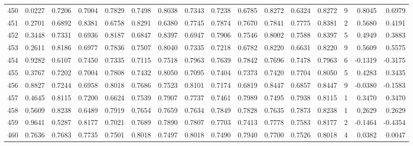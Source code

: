 \begin{tabular}{lrrrrrrrrrrrrrrr}
450 &      0.0227 &  0.7206 &  0.7004 &  0.7829 &  0.7498 &  0.8038 &  0.7343 &  0.7238 &  0.6785 &  0.8272 &   0.6324 &     0.8272 &      9 &                    0.8045 &                     0.6979 \\
451 &      0.2701 &  0.6892 &  0.8381 &  0.6758 &  0.8291 &  0.6380 &  0.7745 &  0.7874 &  0.7670 &  0.7841 &   0.7775 &     0.8381 &      2 &                    0.5680 &                     0.4191 \\
452 &      0.3448 &  0.7331 &  0.6936 &  0.8187 &  0.6847 &  0.8397 &  0.6947 &  0.7906 &  0.7546 &  0.8002 &   0.7588 &     0.8397 &      5 &                    0.4949 &                     0.3883 \\
453 &      0.2611 &  0.8186 &  0.6977 &  0.7836 &  0.7507 &  0.8040 &  0.7335 &  0.7218 &  0.6782 &  0.8220 &   0.6631 &     0.8220 &      9 &                    0.5609 &                     0.5575 \\
454 &      0.9282 &  0.6107 &  0.7450 &  0.7335 &  0.7115 &  0.7518 &  0.7963 &  0.7639 &  0.7842 &  0.7696 &   0.7478 &     0.7963 &      6 &                   -0.1319 &                    -0.3175 \\
455 &      0.3767 &  0.7202 &  0.7004 &  0.7808 &  0.7432 &  0.8050 &  0.7095 &  0.7404 &  0.7373 &  0.7420 &   0.7704 &     0.8050 &      5 &                    0.4283 &                     0.3435 \\
456 &      0.8827 &  0.7244 &  0.6958 &  0.8018 &  0.7686 &  0.7523 &  0.8101 &  0.7174 &  0.6819 &  0.8447 &   0.6857 &     0.8447 &      9 &                   -0.0380 &                    -0.1583 \\
457 &      0.4645 &  0.8115 &  0.7200 &  0.6624 &  0.7539 &  0.7907 &  0.7737 &  0.7461 &  0.7989 &  0.7495 &   0.7938 &     0.8115 &      1 &                    0.3470 &                     0.3470 \\
458 &      0.5609 &  0.8238 &  0.6489 &  0.7919 &  0.7654 &  0.7659 &  0.7634 &  0.7849 &  0.7828 &  0.7635 &   0.7873 &     0.8238 &      1 &                    0.2629 &                     0.2629 \\
459 &      0.9641 &  0.5287 &  0.8177 &  0.7021 &  0.7689 &  0.7890 &  0.7807 &  0.7703 &  0.7413 &  0.7778 &   0.7583 &     0.8177 &      2 &                   -0.1464 &                    -0.4354 \\
460 &      0.7636 &  0.7683 &  0.7735 &  0.7501 &  0.8018 &  0.7497 &  0.8018 &  0.7490 &  0.7940 &  0.7700 &   0.7526 &     0.8018 &      4 &                    0.0382 &                     0.0047 \\

\end{tabular}
